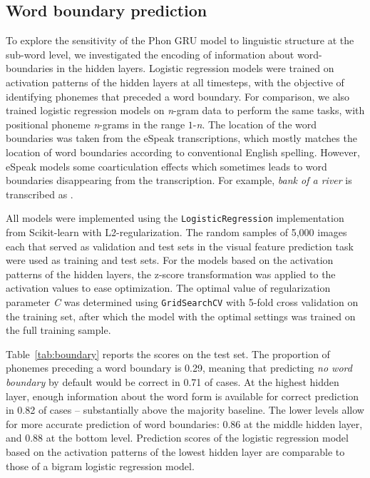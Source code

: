 
\subsection{Word boundary prediction}
To explore the sensitivity of the {\sc Phon GRU} model to linguistic structure at the sub-word level, we investigated the encoding of information about word-boundaries in the hidden layers. Logistic regression models were trained on activation patterns of the hidden layers at all timesteps, with the objective of identifying phonemes that preceded a word boundary. For comparison, we also trained logistic regression models on \textit{n}-gram data to perform the same tasks, with positional phoneme \textit{n}-grams in the range $1$-\textit{n}. The location of the word boundaries was taken from the eSpeak transcriptions, which mostly matches the location of word boundaries according to conventional English spelling. However, eSpeak models some coarticulation effects which sometimes leads to word boundaries disappearing from the transcription. For example, {\it bank of a river} is transcribed as .

All models were implemented using the {\tt LogisticRegression} implementation from Scikit-learn \cite{scikit-learn} with L2-regularization. The random samples of 5,000 images each that served as validation and test sets in the visual feature prediction task were used as training and test sets. For the models based on the activation patterns of the hidden layers, the z-score transformation was applied to the activation values to ease optimization. The optimal value of regularization parameter \textit{C} was determined using {\tt GridSearchCV} with 5-fold cross validation on the training set, after which the model with the optimal settings was trained on the full training sample.

Table~\ref{tab:boundary} reports the scores on the test set. The proportion of phonemes preceding a word boundary is 0.29, meaning that predicting {\it no word boundary} by default would be correct in 0.71 of cases. At the highest hidden layer, enough information about the word form is available for correct prediction in 0.82 of cases -- substantially above the majority baseline. The lower levels allow for more accurate prediction of word boundaries: 0.86 at the middle hidden layer, and 0.88 at the bottom level.
Prediction scores of the logistic regression model based on the activation patterns of the lowest hidden layer are comparable to those of a bigram logistic regression model.

